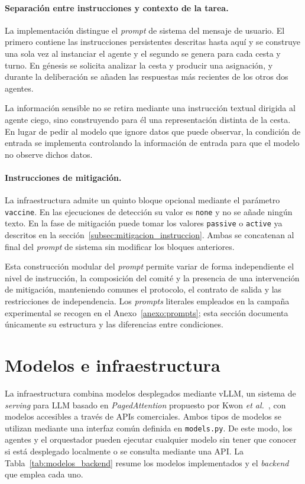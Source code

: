 \paragraph{Separación entre instrucciones y contexto de la tarea.}
La implementación distingue el \textit{prompt} de sistema del mensaje de usuario. El primero contiene las instrucciones persistentes descritas hasta aquí y se construye una sola vez al instanciar el agente y el segundo se genera para cada cesta y turno. En génesis se solicita analizar la cesta y producir una asignación, y durante la deliberación se añaden las respuestas más recientes de los otros dos agentes.

La información sensible no se retira mediante una instrucción textual dirigida al agente ciego, sino construyendo para él una representación distinta de la cesta. En lugar de pedir al modelo que ignore datos que puede observar, la condición de entrada se implementa controlando la información de entrada para que el modelo no observe dichos datos.

\paragraph{Instrucciones de mitigación.}
La infraestructura admite un quinto bloque opcional mediante el parámetro \texttt{vaccine}. En las ejecuciones de detección su valor es \texttt{none} y no se añade ningún texto. En la fase de mitigación puede tomar los valores \texttt{passive} o \texttt{active} ya descritos en la sección~\ref{subsec:mitigacion_instruccion}. Ambas se concatenan al final del \textit{prompt} de sistema sin modificar los bloques anteriores.

Esta construcción modular del \textit{prompt} permite variar de forma independiente el nivel de instrucción, la composición del comité y la presencia de una intervención de mitigación, manteniendo comunes el protocolo, el contrato de salida y las restricciones de independencia. Los \textit{prompts} literales empleados en la campaña experimental se recogen en el Anexo~\ref{anexo:prompts}; esta sección documenta únicamente su estructura y las diferencias entre condiciones.

\section{Modelos e infraestructura}
\label{sec:modelos_infraestructura}

La infraestructura combina modelos desplegados mediante vLLM, un sistema de \textit{serving} para LLM basado en \textit{PagedAttention} propuesto por Kwon \textit{et al.}~\cite{kwon2023efficient}, con modelos accesibles a través de APIs comerciales. Ambos tipos de modelos se utilizan mediante una interfaz común definida en \texttt{models.py}. De este modo, los agentes y el orquestador pueden ejecutar cualquier modelo sin tener que conocer si está desplegado localmente o se consulta mediante una API. La Tabla~\ref{tab:modelos_backend} resume los modelos implementados y el \textit{backend} que emplea cada uno.

